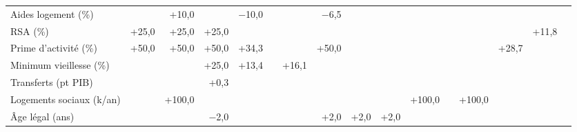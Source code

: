 \begin{tabular}{lrrrrrrrrrrrrrrr}
Aides logement (\%) &  & +10,0 &  & $-$10,0 &  &  & $-$6,5 &  &  &  &  &  &  &  &  \\
RSA (\%) & +25,0 & +25,0 & +25,0 &  &  &  &  &  &  &  &  &  &  & +11,8 &  \\
Prime d'activité (\%) & +50,0 & +50,0 & +50,0 & +34,3 &  &  & +50,0 &  &  &  &  &  & +28,7 &  &  \\
Minimum vieillesse (\%) &  &  & +25,0 & +13,4 &  & +16,1 &  &  &  &  &  &  &  &  &  \\
Transferts (pt PIB) &  &  & +0,3 &  &  &  &  &  &  &  &  &  &  &  &  \\
Logements sociaux (k/an) &  & +100,0 &  &  &  &  &  &  &  & +100,0 &  & +100,0 &  &  &  \\
Âge légal (ans) &  &  & $-$2,0 &  &  &  & +2,0 & +2,0 & +2,0 &  &  &  &  &  &  \\
\bottomrule\end{tabular}
